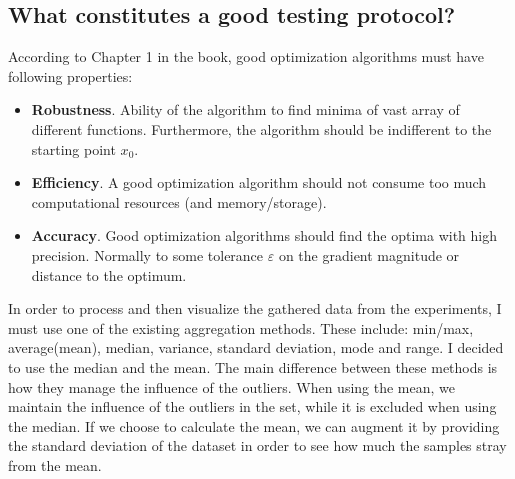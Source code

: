 \documentclass[a4paper]{article}
\begin{document}
\subsection{What constitutes a good testing protocol?}
According to Chapter 1 in the book, good optimization algorithms must have
following properties:
\begin{itemize}
\item \textbf{Robustness}. Ability of the algorithm to find minima of vast array
  of different functions. Furthermore, the algorithm should be indifferent to
  the starting point $x_0$.
\item \textbf{Efficiency}. A good optimization algorithm should not consume too
  much computational resources (and memory/storage).
\item \textbf{Accuracy}. Good optimization algorithms should find the optima
  with high precision. Normally to some tolerance $\varepsilon$ on the gradient
  magnitude or distance to the optimum.
\end{itemize}
In order to process and then visualize the gathered data from the experiments, I
must use one of the existing aggregation methods. These include: min/max,
average(mean), median, variance, standard deviation, mode and range. I decided to use the
median and the mean. The main difference between these methods is how they
manage the influence of the outliers. When using the mean, we maintain the
influence of the outliers in the set, while it is excluded when using the
median. If we choose to calculate the mean, we can augment it by providing the
standard deviation of the dataset in order to see how much the samples stray
from the mean.
\end{document}
